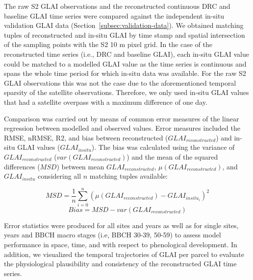 The raw \gls{S2} \gls{GLAI} observations and the reconstructed continuous \gls{DRC} and baseline \gls{GLAI} time series were compared against the independent in-situ validation \gls{GLAI} data (Section~\ref{subsec:validation-data}). We obtained matching tuples of reconstructed and in-situ \gls{GLAI} by time stamp and spatial intersection of the sampling points with the \gls{S2} 10 m pixel grid. In the case of the reconstructed time series (i.e., \gls{DRC} and baseline \gls{GLAI}), each in-situ \gls{GLAI} value could be matched to a modelled \gls{GLAI} value as the time series is continuous and spans the whole time period for which in-situ data was available. For the raw \gls{S2} \gls{GLAI} observations this was not the case due to the aforementioned temporal sparsity of the satellite observations. Therefore, we only used in-situ \gls{GLAI} values that had a satellite overpass with a maximum difference of one day.

Comparison was carried out by means of common error measures of the linear regression between modelled and observed values. Error measures included the \gls{RMSE}, \gls{nRMSE}, \gls{R2}, and bias between reconstructed ($GLAI_{reconstructed}$) and in-situ \gls{GLAI} values ($GLAI_{insitu}$). The bias was calculated using the variance of $GLAI_{reconstructed}$ ($var(GLAI_{reconstructed})$) and the mean of the squared differences ($MSD$) between mean $GLAI_{reconstructed}$, $\mu(GLAI_{reconstructed})$, and $GLAI_{insitu}$ considering all $n$ matching tuples available:

\begin{equation}
    MSD = \frac{1}{n} \sum_{i=0}^{n} (\mu(GLAI_{reconstructed}) - GLAI_{{insitu}_i})^2
\end{equation}
\begin{equation}
    Bias = MSD - var(GLAI_{reconstructed})
\end{equation}

Error statistics were produced for all sites and years as well as for single sites, years and \gls{BBCH} macro stages (i.e, \gls{BBCH} 30-39, 50-59) to assess model performance in space, time, and with respect to phenological development. In addition, we visualized the temporal trajectories of \gls{GLAI} per parcel to evaluate the physiological plausibility and consistency of the reconstructed \gls{GLAI} time series.
